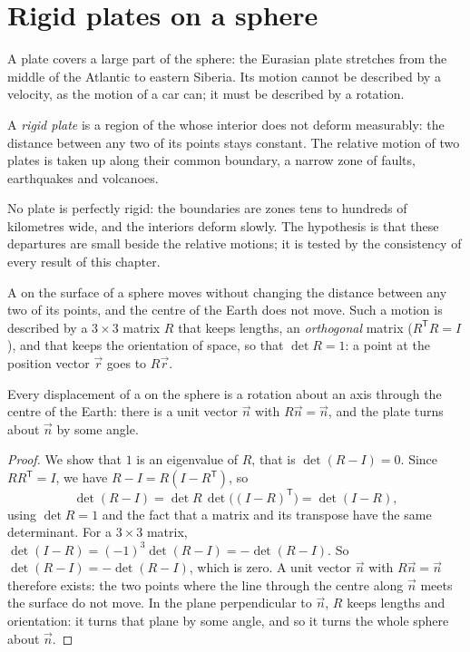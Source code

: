 \section{Rigid plates on a sphere}

A plate covers a large part of the sphere: the Eurasian plate stretches from
the middle of the Atlantic to eastern Siberia. Its motion cannot be described by a velocity, as the
motion of a car can; it must be described by a rotation.

\begin{definition}\label{def:b1:plate-kinematics:rigid-plate}
A \emph{rigid plate} is a region of the  whose
interior does not deform measurably: the distance between any two of its points
stays constant. The relative motion of two plates is taken up along their
common boundary, a narrow zone of faults, earthquakes and volcanoes.
\end{definition}

No plate is perfectly rigid: the boundaries are zones tens to hundreds of
kilometres wide, and the interiors deform slowly. The hypothesis is that these
departures are small beside the relative motions; it is tested by the
consistency of every result of this chapter.

A  on the surface of a sphere moves without changing the distance
between any two of its points, and the centre of the Earth does not move. Such
a motion is described by a $3\times3$ matrix $R$ that keeps lengths, an
\emph{orthogonal} matrix ($R^{\mathsf T}R = I$), and that keeps the orientation
of space, so that $\det R = 1$: a point at the position vector $\vec r$ goes to
$R\vec r$.

\begin{theorem}\label{thm:b1:plate-kinematics:euler}
Every displacement of a  on the sphere is a rotation about an axis
through the centre of the Earth: there is a unit vector $\vec n$ with
$R\vec n = \vec n$, and the plate turns about $\vec n$ by some angle.
\end{theorem}

\begin{proof}
We show that $1$ is an eigenvalue of $R$, that is $\det(R - I) = 0$. Since
$R R^{\mathsf T} = I$, we have $R - I = R(I - R^{\mathsf T})$, so
\[
  \det(R - I) = \det R\,\det\bigl((I - R)^{\mathsf T}\bigr) = \det(I - R),
\]
using $\det R = 1$ and the fact that a matrix and its transpose have the same
determinant. For a $3\times3$ matrix,
$\det(I - R) = (-1)^3\det(R - I) = -\det(R - I)$. So $\det(R - I) =
-\det(R - I)$, which is zero. A unit vector $\vec n$ with $R\vec n = \vec n$
therefore exists: the two points where the line through the centre along
$\vec n$ meets the surface do not move. In the plane perpendicular to $\vec n$,
$R$ keeps lengths and orientation: it turns that plane by some angle, and so
it turns the whole sphere about $\vec n$.
\end{proof}


